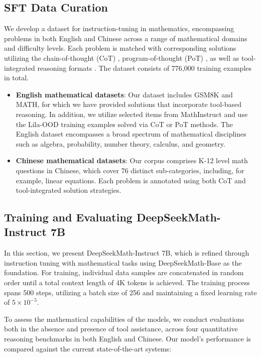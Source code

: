 \begin{itemize}[topsep=0pt]
\subsection{SFT Data Curation}

We develop a dataset for instruction-tuning in mathematics, encompassing problems in both English and Chinese across a range of mathematical domains and difficulty levels. Each problem is matched with corresponding solutions utilizing the chain-of-thought (CoT) \citep{cot}, program-of-thought (PoT) \citep{pot,pal}, as well as tool-integrated reasoning formats \citep{tora}. The dataset consists of 776,000 training examples in total.

\begin{itemize}[topsep=0pt]
    \item \textbf{English mathematical datasets}: Our dataset includes GSM8K and MATH, for which we have provided solutions that incorporate tool-based reasoning. In addition, we utilize selected items from MathInstruct \citep{MathInstruct} and use the Lila-OOD training examples \citep{lila} solved via CoT or PoT methods. The English dataset encompasses a broad spectrum of mathematical disciplines such as algebra, probability, number theory, calculus, and geometry.
    \item \textbf{Chinese mathematical datasets}: Our corpus comprises K-12 level math questions in Chinese, which cover 76 distinct sub-categories, including, for example, linear equations. Each problem is annotated using both CoT and tool-integrated solution strategies.
\end{itemize}

\subsection{Training and Evaluating DeepSeekMath-Instruct 7B}

In this section, we present DeepSeekMath-Instruct 7B, which is refined through instruction tuning with mathematical tasks using DeepSeekMath-Base as the foundation. For training, individual data samples are concatenated in random order until a total context length of 4K tokens is achieved. The training process spans 500 steps, utilizing a batch size of 256 and maintaining a fixed learning rate of $5 \times 10^{-5}$.

To assess the mathematical capabilities of the models, we conduct evaluations both in the absence and presence of tool assistance, across four quantitative reasoning benchmarks in both English and Chinese. Our model's performance is compared against the current state-of-the-art systems:


\end{itemize}
